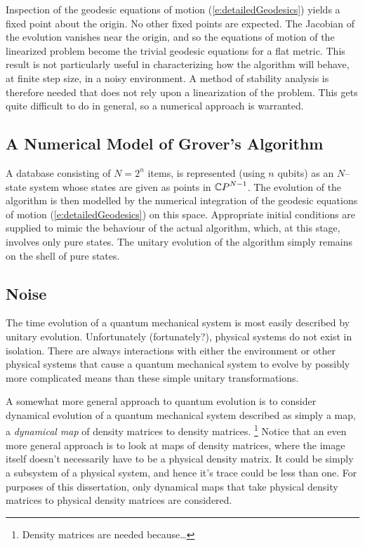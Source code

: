 Inspection of the geodesic equations of motion 
(\ref{e:detailedGeodesics}) yields a fixed point about the 
origin.  No other fixed points are expected. 
The Jacobian of the evolution vanishes near the origin, and
so the equations of motion of the linearized problem become
the trivial geodesic equations for a flat metric.
This result is not particularly useful in characterizing how 
the algorithm will behave, at finite step size, in a noisy 
environment.  
A method of stability analysis
is therefore needed that does not rely upon a linearization
of the problem.  This gets quite difficult to do in general,
so a numerical approach is warranted.

\subsection{A Numerical Model of Grover's Algorithm}

A database consisting of $N=2^n$ items, is represented (using
$n$ qubits) as an $N$--state system whose states are given as
points in ${\mathbb{C} P}^{N-1}$.  The evolution of the algorithm is then 
modelled by the numerical integration of the geodesic equations 
of motion (\ref{e:detailedGeodesics}) on this space.
Appropriate initial conditions are supplied to mimic the behaviour of 
the actual algorithm, which, at this stage, involves only pure 
states.  The unitary evolution of the algorithm simply remains 
on the shell of pure states.


\subsection{Noise}

The time evolution of a quantum mechanical system is most easily
described by unitary evolution.
Unfortunately (fortunately?), physical systems do not exist in 
isolation.  There
are always interactions with either the environment or other 
physical systems that cause a quantum mechanical system to evolve 
by possibly more complicated means than these simple unitary 
transformations.

A somewhat more general approach to quantum evolution is to 
consider dynamical evolution of a quantum mechanical system
described as simply a map, a \emph{dynamical map}\cite{Sudarshan:??}
of density matrices to density matrices.
\footnote{Density matrices are needed because\dots}
Notice that an even more general approach is to look at maps of 
density matrices, where the image itself doesn't necessarily have to
be a physical density matrix.  It could be simply a subsystem
of a physical system, and hence it's trace could be less than
one.  For purposes of this dissertation, only dynamical maps that
take physical density matrices to physical density matrices are
considered.

